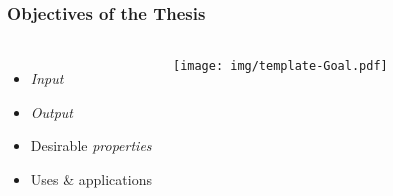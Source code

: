 
\begin{frame}
  \frametitle{Objectives of the Thesis}
  \begin{columns}
    \begin{itemize}
        \item \emph{Input}
        \item \emph{Output}
        \item Desirable \emph{properties}
        \item Uses \& applications
    \end{itemize}
     
        \texttt{[image: img/template-Goal.pdf]}
  \end{columns}
\end{frame}





